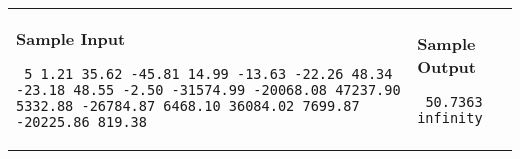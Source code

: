 \documentclass[11pt]{article}
\begin{document}
\vspace{0.25in}\hspace{-0.3in}\begin{tabular}{ll}

\parbox{3in}{{\large\bf Sample Input}

\vspace{0.15in}

{\tt 
5 1.21 35.62 -45.81 14.99 -13.63 -22.26 48.34 -23.18 48.55 -2.50 -31574.99 -20068.08 47237.90 5332.88 -26784.87 6468.10 36084.02 7699.87 -20225.86 819.38
}
}

&

\parbox{3in}{{\large\bf Sample Output}

\vspace{0.15in}

{\tt
50.7363\linebreak
infinity
}
}

\vspace{0.2in}


\\
\end{tabular}
\end{document}
